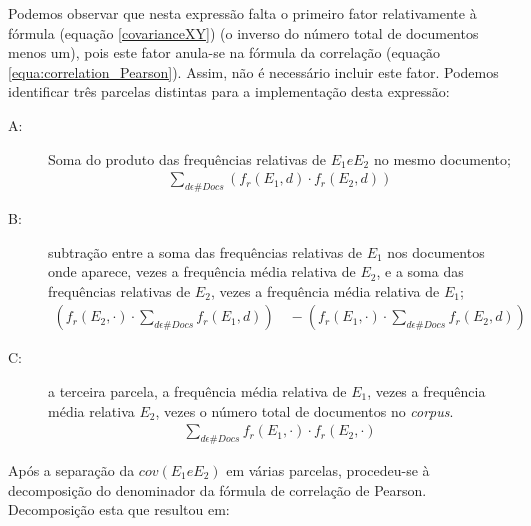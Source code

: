Podemos observar que nesta expressão falta o primeiro fator relativamente à fórmula (equação \ref{covarianceXY}) (o inverso do número total de documentos menos um), pois este fator anula-se na fórmula da correlação (equação \ref{equa:correlation_Pearson}). Assim, não é necessário incluir este fator. Podemos identificar três parcelas distintas para a implementação desta expressão:
\begin{description}
\item[A:] Soma do produto das frequências relativas de $E_{1} e E_{2}$ no mesmo documento;
\begin{equation}
\begin{aligned}
    \sum_{d \epsilon \#Docs} (f_{r}(E_{1}, d)\cdot f_{r}(E_{2}, d))
\end{aligned}
\end{equation}
\item[B:] subtração entre a soma das frequências relativas de $E_{1}$ nos documentos onde aparece, vezes a frequência média relativa de $E_{2}$, e a soma das frequências relativas de $E_{2}$, vezes a frequência média relativa de $E_{1}$;
\begin{equation}
\begin{aligned}
 (f_{r}(E_{2},\cdot) \cdot \!\!\sum_{d \epsilon \#Docs} f_{r}(E_{1},d)) \quad - (f_{r}(E_{1}, \cdot) \cdot \!\!\sum_{d \epsilon \#Docs} f_{r}(E_{2}, d))
\end{aligned}
\end{equation}
\item[C:] a terceira parcela, a frequência média relativa de $E_{1}$, vezes a frequência média relativa $E_{2}$, vezes o número total de documentos no \textit{corpus}.
\begin{equation}
\begin{aligned}
    \sum_{d \epsilon \#Docs} f_{r}(E_{1}, \cdot) \cdot f_{r}(E_{2},\cdot)
\end{aligned}
\end{equation}
\end{description}

Após a separação da $cov(E_{1} e E_{2})$ em várias parcelas, procedeu-se à decomposição do denominador da fórmula de correlação de Pearson. Decomposição esta que resultou em:

